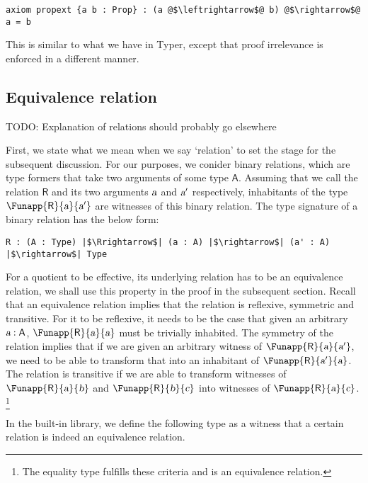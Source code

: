 \documentclass[11pt]{article}
\newcommand\kw[1] {\textsf{#1}}
\newcommand\id[1] {\textsl{#1}}
\begin{document}
\begin{verbatim}
axiom propext {a b : Prop} : (a @$\leftrightarrow$@ b) @$\rightarrow$@ a = b
\end{verbatim}

This is similar to what we have in Typer, except that proof irrelevance is enforced in a different manner.

\subsection{Equivalence relation}
TODO: Explanation of relations should probably go elsewhere

First, we state what we mean when we say `relation' to set the stage for the subsequent discussion. For our purposes, we conider binary relations, which are type formers that take two arguments of some type $\kw{A}$. Assuming that we call the relation $\kw{R}$ and its two arguments $\id{a}$ and $\id{a}'$ respectively, inhabitants of the type $\Funapp{\kw{R}}{\id{a}}{\id{a}'}$ are witnesses of this binary relation. The type signature of a binary relation has the below form:

\begin{verbatim}
R : (A : Type) |$\Rrightarrow$| (a : A) |$\rightarrow$| (a' : A) |$\rightarrow$| Type
\end{verbatim}

For a quotient to be effective, its underlying relation has to be an equivalence relation, we shall use this property in the proof in the subsequent section. Recall that an equivalence relation implies that the relation is reflexive, symmetric and transitive. For it to be reflexive, it needs to be the case that given an arbitrary $\oftype{\id{a}}{\kw{A}}$, $\Funapp{\kw{R}}{\id{a}}{\id{a}}$ must be trivially inhabited. The symmetry of the relation implies that if we are given an arbitrary witness of $\Funapp{\kw{R}}{\id{a}}{\id{a}'}$, we need to be able to transform that into an inhabitant of $\Funapp{\kw{R}}{\id{a}'}{\id{a}}$. The relation is transitive if we are able to transform witnesses of $\Funapp{\kw{R}}{\id{a}}{\id{b}}$ and $\Funapp{\kw{R}}{\id{b}}{\id{c}}$ into witnesses of $\Funapp{\kw{R}}{\id{a}}{\id{c}}$. \footnote{The equality type fulfills these criteria and is an equivalence relation.}

In the built-in library, we define the following type as a witness that a certain relation is indeed an equivalence relation.
\end{document}
